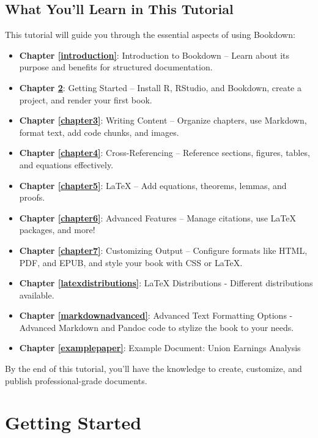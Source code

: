 \documentclass[
]{book}
\providecommand{\tightlist}{%
  \setlength{\itemsep}{0pt}\setlength{\parskip}{0pt}}
\theoremstyle{definition}
\theoremstyle{definition}
\theoremstyle{definition}
\theoremstyle{definition}
\theoremstyle{remark}
\begin{document}
\section{What You'll Learn in This Tutorial}\label{what-youll-learn-in-this-tutorial}

This tutorial will guide you through the essential aspects of using Bookdown:

\begin{itemize}
\tightlist
\item
  \textbf{Chapter \ref{introduction}}: Introduction to Bookdown -- Learn about its purpose and benefits for structured documentation.
\item
  \textbf{Chapter \ref{chapter2}}: Getting Started -- Install R, RStudio, and Bookdown, create a project, and render your first book.
\item
  \textbf{Chapter \ref{chapter3}}: Writing Content -- Organize chapters, use Markdown, format text, add code chunks, and images.
\item
  \textbf{Chapter \ref{chapter4}}: Cross-Referencing -- Reference sections, figures, tables, and equations effectively.
\item
  \textbf{Chapter \ref{chapter5}}: LaTeX -- Add equations, theorems, lemmas, and proofs.
\item
  \textbf{Chapter \ref{chapter6}}: Advanced Features -- Manage citations, use LaTeX packages, and more!
\item
  \textbf{Chapter \ref{chapter7}}: Customizing Output -- Configure formats like HTML, PDF, and EPUB, and style your book with CSS or LaTeX.
\item
  \textbf{Chapter \ref{latexdistributions}}: LaTeX Distributions - Different distributions available.
\item
  \textbf{Chapter \ref{markdownadvanced}}: Advanced Text Formatting Options - Advanced Markdown and Pandoc code to stylize the book to your needs.
\item
  \textbf{Chapter \ref{examplepaper}}: Example Document: Union Earnings Analysis
\end{itemize}

By the end of this tutorial, you'll have the knowledge to create, customize, and publish professional-grade documents.

\chapter{Getting Started}\label{chapter2}
\end{document}
